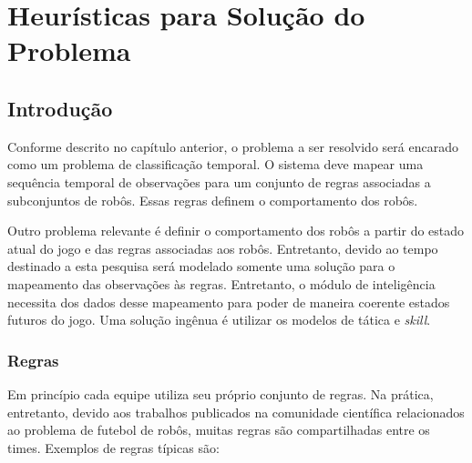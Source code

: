\chapter{Heurísticas para Solução do Problema}\label{cap:heuristicas}

\section{Introdução}

Conforme descrito no capítulo anterior, o problema a ser resolvido será
encarado como um problema de classificação temporal. O sistema deve mapear uma
sequência temporal de observações para um conjunto de regras associadas a
subconjuntos de robôs. Essas regras definem o comportamento dos robôs.

Outro problema relevante é definir o comportamento dos robôs a partir do estado
atual do jogo e das regras associadas aos robôs. Entretanto, devido ao tempo
destinado a esta pesquisa será modelado somente uma solução para o mapeamento das
observações às regras. Entretanto, o módulo de inteligência necessita dos dados
desse mapeamento para poder de maneira coerente estados futuros do jogo. Uma
solução ingênua é utilizar os modelos de tática e \textit{skill}.

\subsection{Regras}

Em princípio cada equipe utiliza seu próprio conjunto de regras.
Na prática, entretanto, devido aos trabalhos publicados na comunidade científica
relacionados ao problema de futebol de robôs, muitas regras são compartilhadas
entre os times. Exemplos de regras típicas são:

